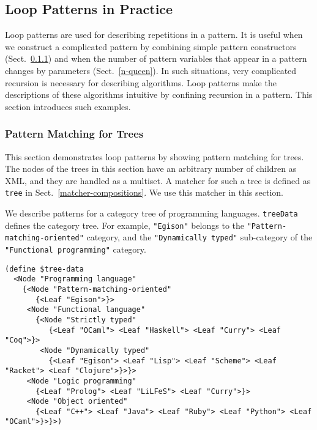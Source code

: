 \documentclass{article}
\begin{document}


\subsection{Loop Patterns in Practice}\label{nested-loop}

Loop patterns are used for describing repetitions in a pattern.
It is useful when we construct a complicated pattern by combining simple pattern constructors (Sect.~\ref{trees}) and when the number of pattern variables that appear in a pattern changes by parameters (Sect.~\ref{n-queen}).
In such situations, very complicated recursion is necessary for describing algorithms.
Loop patterns make the descriptions of these algorithms intuitive by confining recursion in a pattern.
This section introduces such examples.

\subsubsection{Pattern Matching for Trees}\label{trees}

This section demonstrates loop patterns by showing pattern matching for trees.
The nodes of the trees in this section have an arbitrary number of children as XML, and they are handled as a multiset.
A matcher for such a tree is defined as \texttt{tree} in Sect.~\ref{matcher-compositions}.
We use this matcher in this section.

We describe patterns for a category tree of programming languages.
\texttt{treeData} defines the category tree.
For example, \texttt{"Egison"} belongs to the \texttt{"Pattern-matching-oriented"} category, and the \texttt{"Dynamically typed"} sub-category of the \texttt{"Functional programming"} category.

\begin{lstlisting}[language=egison]
(define $tree-data
  <Node "Programming language"
    {<Node "Pattern-matching-oriented"
       {<Leaf "Egison">}>
     <Node "Functional language"
       {<Node "Strictly typed"
          {<Leaf "OCaml"> <Leaf "Haskell"> <Leaf "Curry"> <Leaf "Coq">}>
        <Node "Dynamically typed"
          {<Leaf "Egison"> <Leaf "Lisp"> <Leaf "Scheme"> <Leaf "Racket"> <Leaf "Clojure">}>}>
     <Node "Logic programming"
       {<Leaf "Prolog"> <Leaf "LiLFeS"> <Leaf "Curry">}>
     <Node "Object oriented"
       {<Leaf "C++"> <Leaf "Java"> <Leaf "Ruby"> <Leaf "Python"> <Leaf "OCaml">}>}>)
\end{lstlisting}
\end{document}
